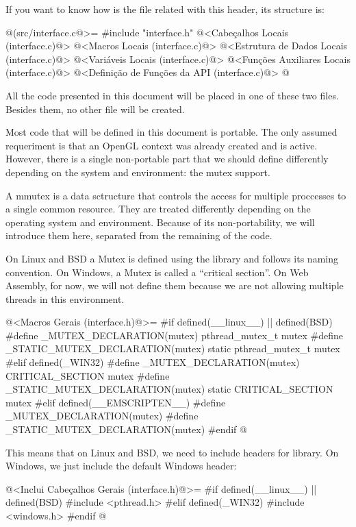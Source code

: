 If you want to know how is the  file related
with this header, its structure is:

\iniciocodigo
@(src/interface.c@>=
#include "interface.h"
@<Cabeçalhos Locais (interface.c)@>
@<Macros Locais (interface.c)@>
@<Estrutura de Dados Locais (interface.c)@>
@<Variáveis Locais (interface.c)@>
@<Funções Auxiliares Locais (interface.c)@>
@<Definição de Funções da API (interface.c)@>
@
\fimcodigo

All the code presented in this document will be placed in one of these
two files. Besides them, no other file will be created.


Most code that will be defined in this document is portable. The only
assumed requeriment is that an OpenGL context was already created and
is active. However, there is a single non-portable part that we should
define differently depending on the system and environment: the mutex
support.

A mmutex is a data sctructure that controls the access for multiple
proccesses to a single common resource. They are treated differently
depending on the operating system and environment. Because of its
non-portability, we will introduce them here, separated from the
remaining of the code.

On Linux and BSD a Mutex is defined using the library
 and follows its naming convention. On Windows, a
Mutex is called a ``critical section''. On Web Assembly, for now, we
will not define them because we are not allowing multiple threads in
this environment.

\iniciocodigo
@<Macros Gerais (interface.h)@>=
#if defined(__linux__) || defined(BSD)
#define _MUTEX_DECLARATION(mutex) pthread_mutex_t mutex
#define _STATIC_MUTEX_DECLARATION(mutex) static pthread_mutex_t mutex
#elif defined(_WIN32)
#define _MUTEX_DECLARATION(mutex) CRITICAL_SECTION mutex
#define _STATIC_MUTEX_DECLARATION(mutex) static CRITICAL_SECTION mutex
#elif defined(__EMSCRIPTEN__)
#define _MUTEX_DECLARATION(mutex)
#define _STATIC_MUTEX_DECLARATION(mutex)
#endif
@
\fimcodigo

This means that on Linux and BSD, we need to include headers for
 library. On Windows, we just include the default
Windows header:

\iniciocodigo
@<Inclui Cabeçalhos Gerais (interface.h)@>=
#if defined(__linux__) || defined(BSD)
#include <pthread.h>
#elif defined(_WIN32)
#include <windows.h>
#endif
@
\fimcodigo

